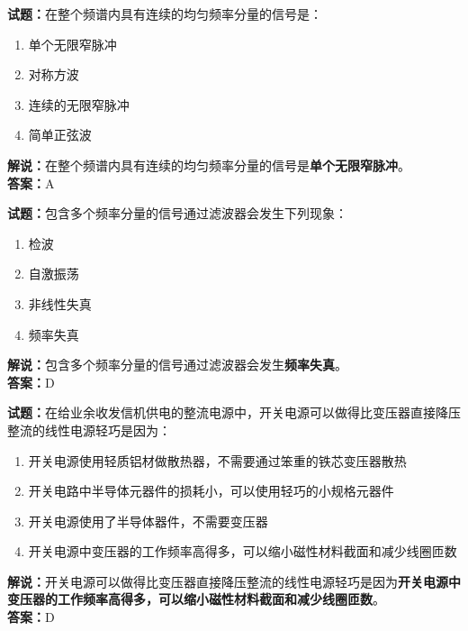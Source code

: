 \documentclass{ctexbook}
\begin{document}
\bigskip


\noindent\textbf{试题：}在整个频谱内具有连续的均匀频率分量的信号是：

\begin{enumerate}[leftmargin=3em]
	\item 单个无限窄脉冲
	\item 对称方波
	\item 连续的无限窄脉冲
	\item 简单正弦波
\end{enumerate}

\noindent\textbf{解说：}在整个频谱内具有连续的均匀频率分量的信号是\textbf{单个无限窄脉冲}。\\\noindent\textbf{答案：}A%


\bigskip


\noindent\textbf{试题：}包含多个频率分量的信号通过滤波器会发生下列现象：

\begin{enumerate}[leftmargin=3em]
	\item 检波
	\item 自激振荡
	\item 非线性失真
	\item 频率失真
\end{enumerate}

\noindent\textbf{解说：}包含多个频率分量的信号通过滤波器会发生\textbf{频率失真}。\\\noindent\textbf{答案：}D%


\bigskip


\noindent\textbf{试题：}在给业余收发信机供电的整流电源中，开关电源可以做得比变压器直接降压整流的线性电源轻巧是因为：

\begin{enumerate}[leftmargin=3em]
	\item 开关电源使用轻质铝材做散热器，不需要通过笨重的铁芯变压器散热
	\item 开关电路中半导体元器件的损耗小，可以使用轻巧的小规格元器件
	\item 开关电源使用了半导体器件，不需要变压器
	\item 开关电源中变压器的工作频率高得多，可以缩小磁性材料截面和减少线圈匝数
\end{enumerate}

\noindent\textbf{解说：}开关电源可以做得比变压器直接降压整流的线性电源轻巧是因为\textbf{开关电源中变压器的工作频率高得多，可以缩小磁性材料截面和减少线圈匝数}。\\\noindent\textbf{答案：}D%
\end{document}
